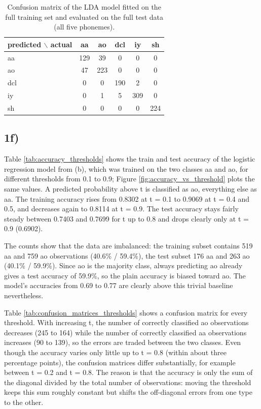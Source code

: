 \documentclass[a4paper]{scrartcl}
\begin{document}
\begin{table}[H]
  \centering
  \begin{tabular}{lccccc}
    \hline
    predicted $\backslash$ actual & aa & ao & dcl & iy & sh \\ \hline
    aa & 129 & 39 & 0 & 0 & 0 \\
    ao & 47 & 223 & 0 & 0 & 0 \\
    dcl & 0 & 0 & 190 & 2 & 0 \\
    iy & 0 & 1 & 5 & 309 & 0 \\
    sh & 0 & 0 & 0 & 0 & 224 \\ \hline
  \end{tabular}
  \caption{Confusion matrix of the LDA model fitted on the full training set and evaluated on the full test data (all five phonemes).}
  \label{tab:lda_full_confusion_matrix}
\end{table}

\subsection*{1f)}

Table \ref{tab:accuracy_thresholds} shows the train and test accuracy of the logistic regression model from (b), which was trained on the two classes aa and ao, for different thresholds from 0.1 to 0.9; Figure \ref{fig:accuracy_vs_threshold} plots the same values.
A predicted probability above t is classified as ao, everything else as aa.
The training accuracy rises from 0.8302 at t = 0.1 to 0.9069 at t = 0.4 and 0.5, and decreases again to 0.8114 at t = 0.9.
The test accuracy stays fairly steady between 0.7403 and 0.7699 for t up to 0.8 and drops clearly only at t = 0.9 (0.6902).

The counts show that the data are imbalanced: the training subset contains 519 aa and 759 ao observations (40.6\% / 59.4\%), the test subset 176 aa and 263 ao (40.1\% / 59.9\%).
Since ao is the majority class, always predicting ao already gives a test accuracy of 59.9\%, so the plain accuracy is biased toward ao.
The model's accuracies from 0.69 to 0.77 are clearly above this trivial baseline nevertheless.

Table \ref{tab:confusion_matrices_thresholds} shows a confusion matrix for every threshold.
With increasing t, the number of correctly classified ao observations decreases (245 to 164) while the number of correctly classified aa observations increases (90 to 139), so the errors are traded between the two classes.
Even though the accuracy varies only little up to t = 0.8 (within about three percentage points), the confusion matrices differ substantially, for example between t = 0.2 and t = 0.8.
The reason is that the accuracy is only the sum of the diagonal divided by the total number of observations: moving the threshold keeps this sum roughly constant but shifts the off-diagonal errors from one type to the other.
\end{document}
